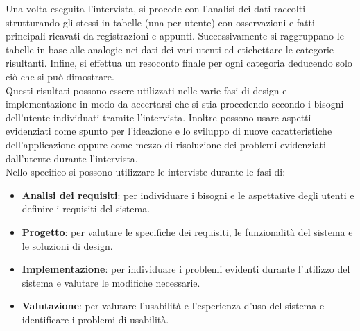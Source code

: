 \documentclass{report}
\begin{document}
	Una volta eseguita l'intervista, si procede con l'analisi dei dati raccolti strutturando gli stessi in tabelle (una per utente) con osservazioni e fatti principali ricavati da registrazioni e appunti. Successivamente si raggruppano le tabelle in base alle analogie nei dati dei vari utenti ed etichettare le categorie risultanti. Infine, si effettua un resoconto finale per ogni categoria deducendo solo ciò che si può dimostrare.
	\vspace{\baselineskip}\\
	Questi risultati possono essere utilizzati nelle varie fasi di design e implementazione in modo da accertarsi che si stia procedendo secondo i bisogni dell'utente individuati tramite l'intervista. Inoltre possono usare aspetti evidenziati come spunto per l'ideazione e lo sviluppo di nuove caratteristiche dell'applicazione oppure come mezzo di risoluzione dei problemi evidenziati dall'utente durante l'intervista.\\
	Nello specifico si possono utilizzare le interviste durante le fasi di:
	\begin{itemize}
		\item \textbf{Analisi dei requisiti}: per individuare i bisogni e le aspettative degli utenti e definire i requisiti del sistema.
		\item \textbf{Progetto}: per valutare le specifiche dei requisiti, le funzionalità del sistema e le soluzioni di design.
		\item \textbf{Implementazione}: per individuare i problemi evidenti durante l'utilizzo del sistema e valutare le modifiche necessarie.
		\item \textbf{Valutazione}: per valutare l'usabilità e l'esperienza d'uso del sistema e identificare i problemi di usabilità.
	\end{itemize}
\end{document}
